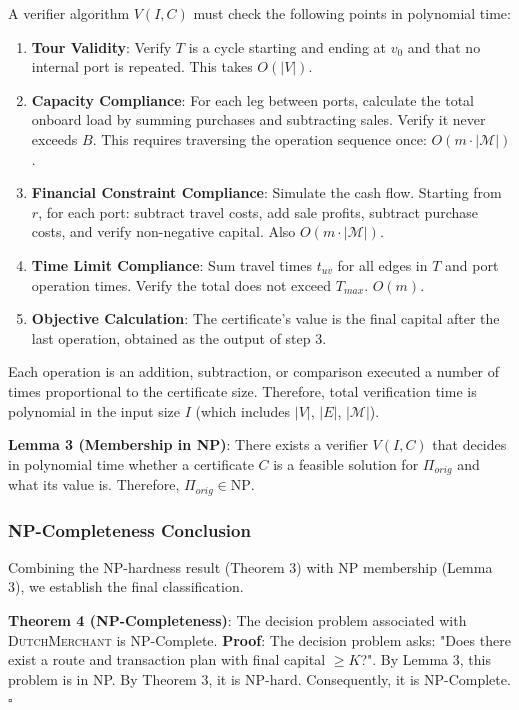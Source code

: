 \documentclass{article} \usepackage[english]{babel} \usepackage[utf8]{inputenc}
\begin{document}
A verifier algorithm $V(I, C)$ must check the following points in polynomial
time: \begin{enumerate} \item \textbf{Tour Validity}: Verify $T$ is a cycle
starting and ending at $v_0$ and that no internal port is repeated. This takes
$O(|V|)$. \item \textbf{Capacity Compliance}: For each leg between ports,
calculate the total onboard load by summing purchases and subtracting sales.
Verify it never exceeds $B$. This requires traversing the operation sequence
once: $O(m \cdot |\mathcal{M}|)$. \item \textbf{Financial Constraint Compliance}:
Simulate the cash flow. Starting from $r$, for each port: subtract travel costs,
add sale profits, subtract purchase costs, and verify non-negative capital.
Also $O(m \cdot |\mathcal{M}|)$. \item \textbf{Time Limit Compliance}: Sum
travel times $t_{uv}$ for all edges in $T$ and port operation times. Verify the
total does not exceed $T_{max}$. $O(m)$. \item \textbf{Objective Calculation}:
The certificate's value is the final capital after the last operation, obtained
as the output of step 3. \end{enumerate}

Each operation is an addition, subtraction, or comparison executed a number of
times proportional to the certificate size. Therefore, total verification time
is polynomial in the input size $I$ (which includes $|V|$, $|E|$,
$|\mathcal{M}|$).

\textbf{Lemma 3 (Membership in NP)}: There exists a verifier $V(I, C)$ that
decides in polynomial time whether a certificate $C$ is a feasible solution for
$\Pi_{orig}$ and what its value is. Therefore, $\Pi_{orig} \in \text{NP}$.

\subsubsection*{NP-Completeness Conclusion} Combining the NP-hardness result
(Theorem 3) with NP membership (Lemma 3), we establish the final classification.

\textbf{Theorem 4 (NP-Completeness)}: The decision problem associated with
\textsc{DutchMerchant} is NP-Complete. \textbf{Proof}: The decision problem asks:
"Does there exist a route and transaction plan with final capital $\geq K$?".
By Lemma 3, this problem is in NP. By Theorem 3, it is NP-hard. Consequently, it
is NP-Complete. \hfill $\square$
\end{document}
